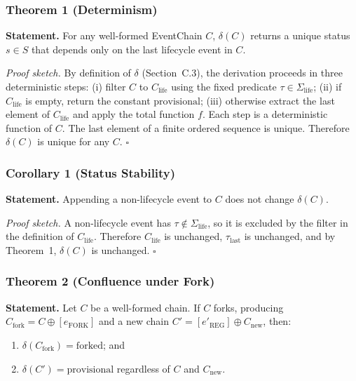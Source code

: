 \subsubsection{Theorem 1 (Determinism)}\label{c.6.1-theorem-1-determinism}

\textbf{Statement.} For any well-formed EventChain $C$, $\delta(C)$ returns a unique status $s \in S$ that depends only on the last lifecycle event in $C$.

\emph{Proof sketch.} By definition of $\delta$ (Section~C.3), the derivation proceeds in three deterministic steps: (i) filter $C$ to $C_{\text{life}}$ using the fixed predicate $\tau \in \Sigma_{\text{life}}$; (ii) if $C_{\text{life}}$ is empty, return the constant $\text{provisional}$; (iii) otherwise extract the last element of $C_{\text{life}}$ and apply the total function $f$. Each step is a deterministic function of $C$. The last element of a finite ordered sequence is unique. Therefore $\delta(C)$ is unique for any $C$. $\square$

\subsubsection{Corollary 1 (Status Stability)}\label{c.6.2-corollary-1-status-stability}

\textbf{Statement.} Appending a non-lifecycle event to $C$ does not change $\delta(C)$.

\emph{Proof sketch.} A non-lifecycle event has $\tau \notin \Sigma_{\text{life}}$, so it is excluded by the filter in the definition of $C_{\text{life}}$. Therefore $C_{\text{life}}$ is unchanged, $\tau_{\text{last}}$ is unchanged, and by Theorem~1, $\delta(C)$ is unchanged. $\square$

\subsubsection{Theorem 2 (Confluence under Fork)}\label{c.6.3-theorem-2-confluence-under-fork}

\textbf{Statement.} Let $C$ be a well-formed chain. If $C$ forks, producing $C_{\text{fork}} = C \oplus [e_{\text{FORK}}]$ and a new chain $C' = [e'_{\text{REG}}] \oplus C_{\text{new}}$, then:
\begin{enumerate}
\def\labelenumi{\arabic{enumi}.}
\tightlist
\item
  $\delta(C_{\text{fork}}) = \text{forked}$; and
\item
  $\delta(C') = \text{provisional}$ regardless of $C$ and $C_{\text{new}}$.
\end{enumerate}

